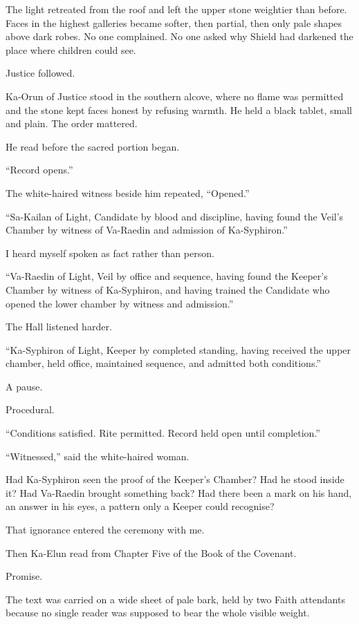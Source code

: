 The light retreated from the roof and left the upper stone weightier than before.
Faces in the highest galleries became softer, then partial, then only pale shapes above dark robes.
No one complained.
No one asked why Shield had darkened the place where children could see.\par
Justice followed.\par
Ka-Orun of Justice stood in the southern alcove, where no flame was permitted and the stone kept faces honest by refusing warmth.
He held a black tablet, small and plain.
The order mattered.\par
He read before the sacred portion began.\par
``Record opens.''\par
The white-haired witness beside him repeated, ``Opened.''\par
``Sa-Kailan of Light, Candidate by blood and discipline, having found the Veil's Chamber by witness of Va-Raedin and admission of Ka-Syphiron.''\par
I heard myself spoken as fact rather than person.\par
``Va-Raedin of Light, Veil by office and sequence, having found the Keeper's Chamber by witness of Ka-Syphiron, and having trained the Candidate who opened the lower chamber by witness and admission.''\par
The Hall listened harder.\par
``Ka-Syphiron of Light, Keeper by completed standing, having received the upper chamber, held office, maintained sequence, and admitted both conditions.''\par
A pause.\par
Procedural.\par
``Conditions satisfied.
Rite permitted.
Record held open until completion.''\par
``Witnessed,'' said the white-haired woman.\par
Had Ka-Syphiron seen the proof of the Keeper's Chamber?
Had he stood inside it?
Had Va-Raedin brought something back?
Had there been a mark on his hand, an answer in his eyes, a pattern only a Keeper could recognise?\par
That ignorance entered the ceremony with me.\par
Then Ka-Elun read from Chapter Five of the Book of the Covenant.\par
Promise.\par
The text was carried on a wide sheet of pale bark, held by two Faith attendants because no single reader was supposed to bear the whole visible weight.
